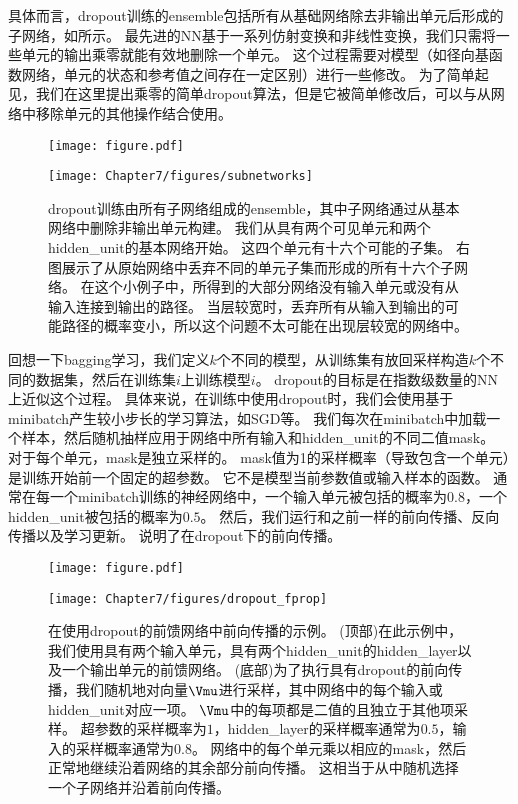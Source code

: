 具体而言，\gls{dropout}训练的\gls{ensemble}包括所有从基础网络除去非输出单元后形成的子网络，如所示。
最先进的\gls{NN}基于一系列仿射变换和非线性变换，我们只需将一些单元的输出乘零就能有效地删除一个单元。
这个过程需要对模型（如径向基函数网络，单元的状态和参考值之间存在一定区别）进行一些修改。
为了简单起见，我们在这里提出乘零的简单\gls{dropout}算法，但是它被简单修改后，可以与从网络中移除单元的其他操作结合使用。
\begin{figure}[!htb]
\ifOpenSource
\centerline{\texttt{[image: figure.pdf]}}
\else
\centerline{\texttt{[image: Chapter7/figures/subnetworks]}}
\fi
\caption{\gls{dropout}训练由所有子网络组成的\gls{ensemble}，其中子网络通过从基本网络中删除非输出单元构建。
我们从具有两个可见单元和两个\gls{hidden_unit}的基本网络开始。
这四个单元有十六个可能的子集。
右图展示了从原始网络中丢弃不同的单元子集而形成的所有十六个子网络。
在这个小例子中，所得到的大部分网络没有输入单元或没有从输入连接到输出的路径。
当层较宽时，丢弃所有从输入到输出的可能路径的概率变小，所以这个问题不太可能在出现层较宽的网络中。}
\label{fig:chap7_subnetworks}
\end{figure}


回想一下\gls{bagging}学习，我们定义$k$个不同的模型，从训练集有放回采样构造$k$个不同的数据集，然后在训练集$i$上训练模型$i$。
\gls{dropout}的目标是在指数级数量的\gls{NN}上近似这个过程。
具体来说，在训练中使用\gls{dropout}时，我们会使用基于\gls{minibatch}产生较小步长的学习算法，如\gls{SGD}等。
我们每次在\gls{minibatch}中加载一个样本，然后随机抽样应用于网络中所有输入和\gls{hidden_unit}的不同二值\gls{mask}。
对于每个单元，\gls{mask}是独立采样的。
\gls{mask}值为1的采样概率（导致包含一个单元）是训练开始前一个固定的超参数。
它不是模型当前参数值或输入样本的函数。
通常在每一个\gls{minibatch}训练的神经网络中，一个输入单元被包括的概率为$0.8$，一个\gls{hidden_unit}被包括的概率为$0.5$。
然后，我们运行和之前一样的前向传播、反向传播以及学习更新。
说明了在\gls{dropout}下的前向传播。
\begin{figure}[!htb]
\ifOpenSource
\centerline{\texttt{[image: figure.pdf]}}
\else
\centerline{\texttt{[image: Chapter7/figures/dropout\_fprop]}}
\fi
\caption{在使用\gls{dropout}的前馈网络中前向传播的示例。
(顶部)在此示例中，我们使用具有两个输入单元，具有两个\gls{hidden_unit}的\gls{hidden_layer}以及一个输出单元的前馈网络。
(底部)为了执行具有\gls{dropout}的前向传播，我们随机地对向量$\Vmu$进行采样，其中网络中的每个输入或\gls{hidden_unit}对应一项。
$\Vmu$中的每项都是二值的且独立于其他项采样。
超参数的采样概率为$1$，\gls{hidden_layer}的采样概率通常为$0.5$，输入的采样概率通常为$0.8$。
网络中的每个单元乘以相应的\gls{mask}，然后正常地继续沿着网络的其余部分前向传播。
这相当于从中随机选择一个子网络并沿着前向传播。
}
\label{fig:chap7_dropout_fprop}
\end{figure}


